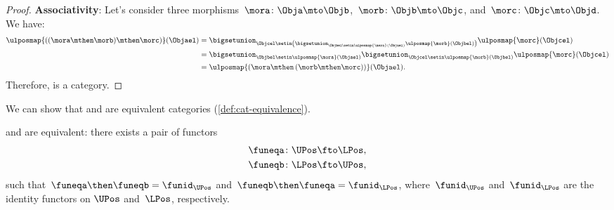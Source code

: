 \begin{proof}
    \textbf{Associativity}:
    Let's consider three morphisms~$\mora\colon \Obja \mto \Objb$,~$\morb\colon \Objb\mto \Objc$, and~$\morc\colon \Objc\mto \Objd$.
    We have:
    \begin{equation*}
        \begin{aligned}
            \ulposmap{\left( (\mora \mthen \morb) \mthen \morc\right)}(\Objael) & =
            \bigsetunion_{\Objcel \setin \left( \bigsetunion_{\Objbel \setin \ulposmap{\mora}(\Objael)}\ulposmap{\morb}(\Objbel)\right)}\ulposmap{\morc}(\Objcel) \\
                                                                                & =\bigsetunion_{\Objbel\setin \ulposmap{\mora}(\Objael)}\bigsetunion_{\Objcel\setin \ulposmap{\morb}(\Objbel)}\ulposmap{\morc}(\Objcel) \\
                                                                                & =\ulposmap{\left( \mora \mthen \left( \morb\mthen \morc\right)\right)}(\Objael).
        \end{aligned}
    \end{equation*}
    Therefore, \UPos is a category.
\end{proof}

We can show that \UPos and \LPos are equivalent categories (\cref{def:cat-equivalence}).

\begin{lemma}
    \label{lem:ulposequiv}
    \UPos and \LPos are equivalent: there exists a pair of functors
    \begin{equation}
        \begin{aligned}
            \funeqa\colon \UPos & \fto \LPos, \\
            \funeqb\colon \LPos & \fto \UPos,
        \end{aligned}
    \end{equation}
    such that~$\funeqa \then \funeqb=\funid_{\UPos}$ and~$\funeqb \then \funeqa=\funid_{\LPos}$, where~$\funid_{\UPos}$ and~$\funid_{\LPos}$ are the identity functors on $\UPos$ and~$\LPos$, respectively.
\end{lemma}

